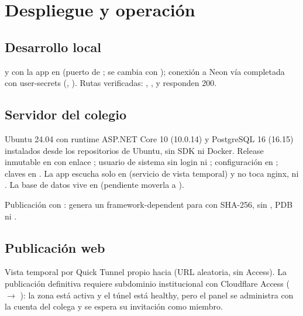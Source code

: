 \section{Despliegue y operación}

\subsection{Desarrollo local}

 y
 con la app en  (puerto de
; se cambia con ); conexión a
Neon vía  completada con user-secrets
(, ). Rutas
verificadas: \codigo{/}, ,  y
 responden 200.

\subsection{Servidor del colegio}

Ubuntu 24.04 con runtime ASP.NET Core 10 (10.0.14) y PostgreSQL 16 (16.15)
instalados desde los repositorios de Ubuntu, sin SDK ni Docker. Release
inmutable en  con enlace
; usuario de sistema  sin login ni
; configuración en ; claves en
. La app escucha solo en
 (servicio de vista temporal) y no toca nginx,
 ni . La base de datos vive en
 (pendiente moverla a
).

Publicación con : genera un 
framework-dependent para  con SHA-256, sin
, PDB ni .

\subsection{Publicación web}

Vista temporal por Quick Tunnel propio hacia  (URL
 aleatoria, sin Access). La publicación definitiva
requiere subdominio institucional con Cloudflare Access
( $\rightarrow$ ):
la zona  está activa y el túnel 
está healthy, pero el panel se administra con la cuenta del colega y se
espera su invitación como miembro.


